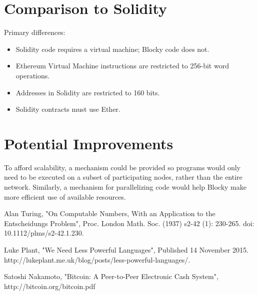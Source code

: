 \documentclass[letterpaper]{article}
\begin{document}
\section{Comparison to Solidity}

Primary differences:
\begin{itemize}
  \item{Solidity code requires a virtual machine; Blocky code does not.}
  \item{Ethereum Virtual Machine instructions are restricted to 256-bit word operations.}
  \item{Addresses in Solidity are restricted to 160 bits.}
  \item{Solidity contracts must use Ether.}
\end{itemize}

\section{Potential Improvements}
To afford scalability, a mechanism could be provided so programs would only need to be executed on a subset of participating nodes, rather than the entire network. Similarly, a mechanism for parallelizing code would help Blocky make more efficient use of available resources.

\begin{thebibliography}{9}

  Alan Turing,
  "On Computable Numbers, With an Application to the Entscheidungs Problem",
  Proc. London Math. Soc. (1937) s2-42 (1): 230-265.
  doi: 10.1112/plms/s2-42.1.230.
  
  Luke Plant,
  "We Need Less Powerful Languages",
  Published 14 November 2015.
  http://lukeplant.me.uk/blog/posts/less-powerful-languages/.
  
  Satoshi Nakamoto,
  "Bitcoin: A Peer-to-Peer Electronic Cash System",
  http://bitcoin.org/bitcoin.pdf
  
\end{thebibliography}
  
\end{document}
